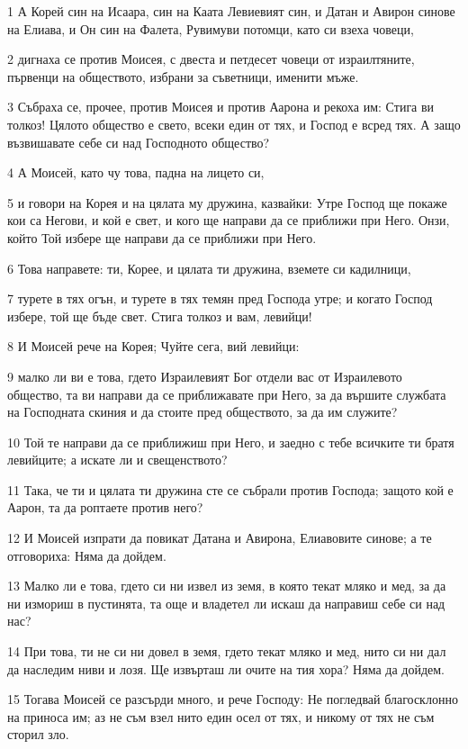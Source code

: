 \par 1 А Корей син на Исаара, син на Каата Левиевият син, и Датан и Авирон синове на Елиава, и Он син на Фалета, Рувимуви потомци, като си взеха човеци,
\par 2 дигнаха се против Моисея, с двеста и петдесет човеци от израилтяните, първенци на обществото, избрани за съветници, именити мъже.
\par 3 Събраха се, прочее, против Моисея и против Аарона и рекоха им: Стига ви толкоз! Цялото общество е свето, всеки един от тях, и Господ е всред тях. А защо възвишавате себе си над Господното общество?
\par 4 А Моисей, като чу това, падна на лицето си,
\par 5 и говори на Корея и на цялата му дружина, казвайки: Утре Господ ще покаже кои са Негови, и кой е свет, и кого ще направи да се приближи при Него. Онзи, който Той избере ще направи да се приближи при Него.
\par 6 Това направете: ти, Корее, и цялата ти дружина, вземете си кадилници,
\par 7 турете в тях огън, и турете в тях темян пред Господа утре; и когато Господ избере, той ще бъде свет. Стига толкоз и вам, левийци!
\par 8 И Моисей рече на Корея; Чуйте сега, вий левийци:
\par 9 малко ли ви е това, гдето Израилевият Бог отдели вас от Израилевото общество, та ви направи да се приближавате при Него, за да вършите службата на Господната скиния и да стоите пред обществото, за да им служите?
\par 10 Той те направи да се приближиш при Него, и заедно с тебе всичките ти братя левийците; а искате ли и свещенството?
\par 11 Така, че ти и цялата ти дружина сте се събрали против Господа; защото кой е Аарон, та да роптаете против него?
\par 12 И Моисей изпрати да повикат Датана и Авирона, Елиавовите синове; а те отговориха: Няма да дойдем.
\par 13 Малко ли е това, гдето си ни извел из земя, в която текат мляко и мед, за да ни измориш в пустинята, та още и владетел ли искаш да направиш себе си над нас?
\par 14 При това, ти не си ни довел в земя, гдето текат мляко и мед, нито си ни дал да наследим ниви и лозя. Ще извърташ ли очите на тия хора? Няма да дойдем.
\par 15 Тогава Моисей се разсърди много, и рече Господу: Не погледвай благосклонно на приноса им; аз не съм взел нито един осел от тях, и никому от тях не съм сторил зло.
